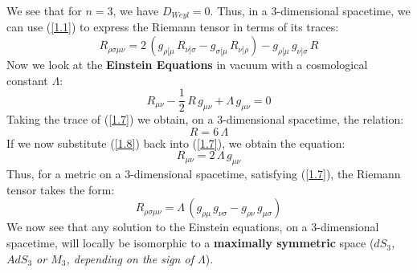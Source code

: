 We see that for $n=3$, we have $D_{Weyl} = 0$. Thus, in a $3$-dimensional spacetime, we can use (\ref{1.1}) to express the Riemann tensor in terms of its traces:
%
%
\begin{equation}
R_{\rho\sigma\mu\nu} =
2 \, (g_{\rho[\mu} \, R_{\nu]\sigma} - g_{\sigma[\mu} \, R_{\nu]\rho})
- g_{\rho[\mu} \, g_{\nu]\sigma} \, R
\end{equation}
%
%
Now we look at the \textbf{Einstein Equations} in vacuum with a cosmological constant $\Lambda$:
%
%
\begin{equation}\label{1.7}
R_{\mu\nu} - \frac{1}{2} \, R \, g_{\mu\nu} + \Lambda \, g_{\mu\nu} = 0
\end{equation}
%
%
Taking the trace of (\ref{1.7}) we obtain, on a $3$-dimensional spacetime, the relation:
%
%
\begin{equation}\label{1.8}
R = 6 \, \Lambda
\end{equation}
%
%
If we now substitute (\ref{1.8}) back into (\ref{1.7}), we obtain the equation:
%
%
\begin{equation}
R_{\mu\nu} = 2 \, \Lambda \, g_{\mu\nu}
\end{equation}
%
%
Thus, for a metric on a $3$-dimensional spacetime, satisfying (\ref{1.7}), the Riemann tensor takes the form:
%
%
\begin{equation}
\boxed{
R_{\rho\sigma\mu\nu} =
\Lambda \, (g_{\rho\mu} \, g_{\nu\sigma} - g_{\rho\nu} \, g_{\mu\sigma})
}
\end{equation}
%
%
We now see that any solution to the Einstein equations, on a $3$-dimensional spacetime, will locally be isomorphic to a \textbf{maximally symmetric} space (\textit{$dS_3$, $AdS_3$ or $M_3$, depending on the sign of $\Lambda$}).

